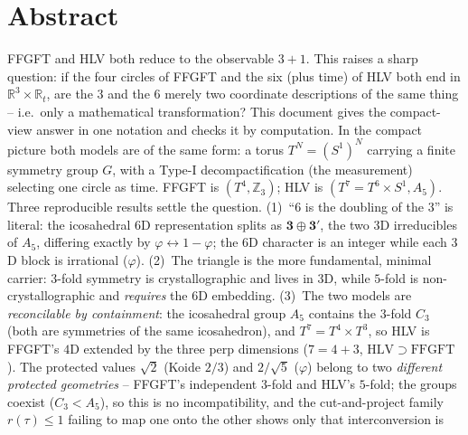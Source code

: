 
\section*{Abstract}
FFGFT and HLV both reduce to the observable $3{+}1$. This raises a sharp question: if
the four circles of FFGFT and the six (plus time) of HLV both end in $\mathbb{R}^3\times
\mathbb{R}_t$, are the $3$ and the $6$ merely two coordinate descriptions of the same
thing -- i.e.\ only a mathematical transformation? This document gives the compact-view
answer in one notation and checks it by computation. In the compact picture both models
are of the same form: a torus $T^N=(S^1)^N$ carrying a finite symmetry group $G$, with a
Type-I decompactification (the measurement) selecting one circle as time. FFGFT is
$(T^4, \mathbb{Z}_3)$; HLV is $(T^7=T^6\times S^1, A_5)$. Three reproducible results
settle the question. (1)~``$6$ is the doubling of the $3$'' is literal: the icosahedral
$6$D representation splits as $\mathbf{3}\oplus\mathbf{3'}$, the two $3$D irreducibles of
$A_5$, differing exactly by $\varphi\leftrightarrow 1-\varphi$; the $6$D character is an
integer while each $3$D block is irrational ($\varphi$). (2)~The triangle is the more
fundamental, minimal carrier: $3$-fold symmetry is crystallographic and lives in $3$D,
while $5$-fold is non-crystallographic and \emph{requires} the $6$D embedding. (3)~The two
models are \emph{reconcilable by containment}: the icosahedral group $A_5$ contains the
$3$-fold $C_3$ (both are symmetries of the same icosahedron), and $T^7=T^4\times T^3$, so
HLV is FFGFT's $4$D extended by the three perp dimensions ($7=4+3$, $\mathrm{HLV}\supset
\mathrm{FFGFT}$). The protected values $\sqrt2$ (Koide $2/3$) and $2/\sqrt5$ ($\varphi$) belong to two
\emph{different protected geometries} -- FFGFT's independent $3$-fold and HLV's $5$-fold;
the groups coexist ($C_3<A_5$), so this is no incompatibility, and the cut-and-project
family $r(\tau)\le1$ failing to map one onto the other shows only that interconversion is
